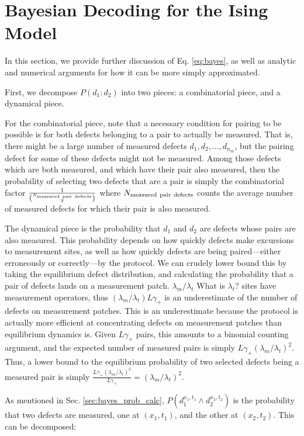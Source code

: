 \documentclass[twocolumn,superscriptaddress,aps,prb,floatfix]{revtex4-1}
\newcommand{\MS}[1]{{\color{mauve} {#1}}}
\begin{document}
\section{Bayesian Decoding for the Ising Model}
\label{sec:bayesdecoder}

In this section, we provide further discussion of Eq. \ref{eq:bayes}, as well as analytic and numerical arguments for how it can be more simply approximated.

First, we decompose $P(d_1 : d_2)$ into two pieces: a combinatorial piece, and a dynamical piece.

For the combinatorial piece, note that a necessary condition for pairing to be possible is for both defects belonging to a pair to actually be measured.  That is, there might be a large number of measured defects ${d_1, d_2, ..., d_{n_m}}$, but the pairing defect for some of these defects might not be measured. Among those defects which are both measured, and which have their pair also measured, then the probability of selecting two defects that are a pair is simply the combinatorial factor $\frac{1}{\binom{N_{\rm{measured\ pair\ defects}}}{2}}$ where $N_{\rm{measured\ pair\ defects}}$ counts the average number of measured defects for which their pair is also measured.

The dynamical piece is the probability that $d_1$ and $d_2$ are defects whose pairs are also measured.  This probability depends on how quickly defects make excursions to measurement sites, as well as how quickly defects are being paired---either erroneously or correctly---by the protocol.  We can crudely lower bound this by taking the equilibrium defect distribution, and calculating the probability that a pair of defects lands on a measurement patch.  $\lambda_m / \lambda_t$ \MS{What is $\lambda_t$?} sites have measurement operators, thus $(\lambda_m / \lambda_t) L \gamma_+$ is an underestimate of the number of defects on measurement patches.  This is an underestimate because the protocol is actually more efficient at concentrating defects on measurement patches than equilibrium dynamics is.  Given $L \gamma_+$ pairs, this amounts to a binomial counting argument, and the expected number of measured pairs is simply $L \gamma_+ (\lambda_m / \lambda_t)^2$.  Thus, a lower bound to the equilibrium probability of two selected defects being a measured pair is simply $\frac{L \gamma_+(\lambda_m / \lambda_t)^2}{L \gamma_+} = (\lambda_m / \lambda_t)^2$.

As mentioned in Sec. \ref{sec:bayes_prob_calc}, $P(d_1^{x_1,t_1}\wedge d_2^{x_2,t_2})$ is the probability that two defects are measured, one at $(x_1,t_1)$, and the other at $(x_2,t_2)$.  This can be decomposed:
\end{document}
